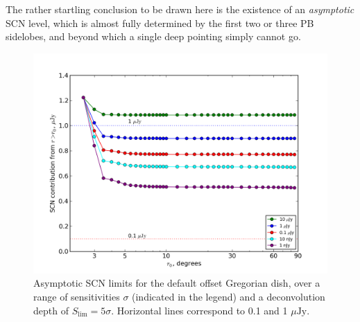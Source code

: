 \documentclass{aa}
\newcommand{\uJy}{$\mu\mathrm{Jy}$}
\begin{document}
The rather startling conclusion to be drawn here is the existence of an {\em asymptotic} SCN level, which is almost fully determined by the first two or three PB sidelobes, and beyond which a single deep pointing simply cannot go. 

\begin{figure}
\includegraphics[width=\columnwidth]{costcurves-asymptotic}


\caption{\label{fig:cc-asymptotes}Asymptotic SCN limits for the default offset Gregorian dish, over a range of sensitivities $\sigma$ (indicated in the legend) and a deconvolution depth of $S_\mathrm{lim}=5\sigma$. Horizontal lines correspond to 0.1 and 1 \uJy.}
\end{figure}
\end{document}
